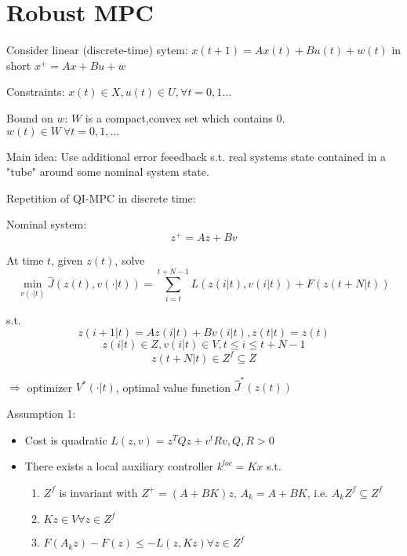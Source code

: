 \section{Robust MPC}

Consider linear (discrete-time) sytem:
$x(t+1) = Ax(t) + Bu(t) + w(t)$
in short $x^+=Ax+Bu+w$

Constraints: $x(t) \in X, u(t) \in U, \forall t = 0,1...$

Bound on $w$:
$W$ is a compact,convex set which contains $0$. $w(t) \in W \ \forall t =0,1,...$

Main idea:
Use additional error feeedback s.t. real systems state contained in a "tube" around some nominal system state.

Repetition of QI-MPC in discrete time:

Nominal system:
\begin{equation*}
z^+ = Az+Bv
\end{equation*}

At time $t$, given $z(t)$, solve 
\begin{equation*}
\min_{v(\cdot | t)} \hat J(z(t),v(\cdot|t)) = \sum_{i=t}^{t+N-1}L(z(i|t),v(i|t)) + F(z(t+N|t))
\end{equation*} 

s.t. 
\begin{equation*}
z(i+1|t) = Az(i|t)+Bv(i|t), z(t|t) = z(t)
\end{equation*}
\begin{equation*}
z(i|t) \in Z, v(i|t) \in V, t \leq i \leq t+N-1
\end{equation*}
\begin{equation*}
z(t+N|t) \in Z^f \subseteq Z
\end{equation*}

$\Rightarrow$ optimizer $V^*(\cdot|t)$, optimal value function $\hat J^*(z(t))$

Assumption 1:
\begin{itemize}
\item Cost is quadratic $L(z,v) = z^TQz + v^tRv, Q,R > 0$
\item There exists a local auxiliary controller $k^{loc} = Kx$ s.t.
\begin{enumerate}
\item $Z^f$ is invariant with $Z^+=(A+BK)z$, $A_k = A+BK$, i.e. $A_kZ^f \subseteq Z^f$
\item $Kz \in V \forall z \in Z^f$
\item $F(A_kz)-F(z) \leq - L(z,Kz) \forall z \in Z^f$
\end{enumerate}
\end{itemize}

